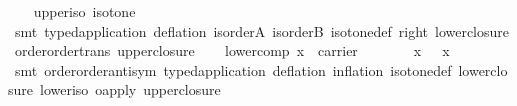 \begin{isabellebody}
\endisatagproof
{\isafoldproof}%
%
\isadelimproof
\isanewline
%
\endisadelimproof
\isanewline
\ \ \isamarkupfalse%
\ upper{}iso{}\ {}isotone\ {}\ {}\ {}\isanewline
%
\isadelimproof
\ \ \ \ %
\endisadelimproof
%
\isatagproof
{}\isamarkupfalse%
\ {}smt\ typed{}application\ deflation\ is{}order{}A\ is{}order{}B\ isotone{}def\ right\ lower{}closure\ order{}order{}trans\ upper{}closure{}%
\endisatagproof
{\isafoldproof}%
%
\isadelimproof
\isanewline
%
\endisadelimproof
\isanewline
\ \ \isamarkupfalse%
\ lower{}comp{}\ {}x\ {}\ carrier\ {}\ {}\ {}{}\ {}\ {}\ {}\ {}\ x\ {}\ {}\ x{}\isanewline
%
\isadelimproof
\ \ \ \ %
\endisadelimproof
%
\isatagproof
{}\isamarkupfalse%
\ {}smt\ order{}order{}antisym\ typed{}application\ deflation\ inflation\ isotone{}def\ lower{}closure\ lower{}iso\ o{}apply\ upper{}closure{}%

\end{isabellebody}
